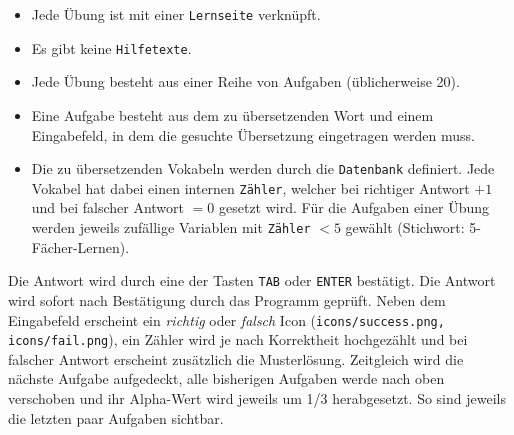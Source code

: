 \begin{itemize}
	\item Jede Übung ist mit einer \texttt{Lernseite} verknüpft.
	\item Es gibt keine \texttt{Hilfetexte}.
	\item Jede Übung besteht aus einer Reihe von Aufgaben (üblicherweise 20).
	\item Eine Aufgabe besteht aus dem zu übersetzenden Wort und einem Eingabefeld, in dem die gesuchte Übersetzung eingetragen werden muss.
	\item Die zu übersetzenden Vokabeln werden durch die \texttt{Datenbank} definiert.
		Jede Vokabel hat dabei einen internen \texttt{Zähler}, welcher bei richtiger Antwort $+1$ und bei falscher Antwort $=0$ gesetzt wird.
		Für die Aufgaben einer Übung werden jeweils zufällige Variablen mit \texttt{Zähler} $<5$ gewählt (Stichwort: 5-Fächer-Lernen).

\end{itemize}

Die Antwort wird durch eine der Tasten \texttt{TAB} oder \texttt{ENTER} bestätigt. 
Die Antwort wird sofort nach Bestätigung durch das Programm geprüft. 
Neben dem Eingabefeld erscheint ein \emph{richtig} oder \emph{falsch} Icon (\texttt{icons/success.png, icons/fail.png}), ein Zähler wird je nach Korrektheit hochgezählt und bei falscher Antwort erscheint zusätzlich die Musterlösung.
Zeitgleich wird die nächste Aufgabe aufgedeckt, alle bisherigen Aufgaben werde nach oben verschoben und ihr Alpha-Wert wird jeweils um 1/3 herabgesetzt.
So sind jeweils die letzten paar Aufgaben sichtbar.

